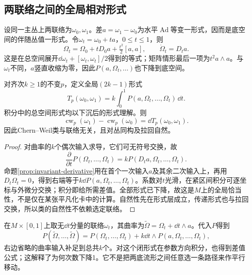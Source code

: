 \subsection{两联络之间的全局相对形式}
设同一主丛上两联络为$\omega_0,\omega_1$。差$a=\omega_1-\omega_0$为水平$\operatorname{Ad}$等变一形式，因而是底空间的伴随丛值一形式。令$\omega_t=\omega_0+ta$，$0\leq t\leq1$，则
\begin{equation}\label{eq:curvature-interpolation}
 \Omega_t=\Omega_0+tD_0a+\tfrac{t^2}{2}[a,a],
 \qquad \dot\Omega_t=D_ta.
\end{equation}
这是在总空间展开$\dd\omega_t+[\omega_t,\omega_t]/2$得到的等式；矩阵情形最后一项为$t^2a\wedge a$。与$\omega_t$不同，$a$竖直收缩为零，因此$P(a,\Omega_t,\ldots)$也下降到底空间。

\begin{theorem}[相对传递公式]\label{thm:cw-transgression}
对齐次$k\geq1$的不变$p$，定义全局$(2k-1)$形式
\begin{equation}\label{eq:cw-transgression}
 T_p(\omega_0,\omega_1)
 =k\int_0^1P(a,\Omega_t,\ldots,\Omega_t)\,\dd t.
\end{equation}
积分中的总空间形式均以下沉后的形式理解。则
\begin{equation}\label{eq:cw-difference}
 \operatorname{cw}_p(\omega_1)-\operatorname{cw}_p(\omega_0)
 =\dd T_p(\omega_0,\omega_1).
\end{equation}
因此Chern--Weil类与联络无关，且对丛同构及拉回自然。
\end{theorem}
\begin{proof}
对曲率的$k$个偶次输入求导，它们可无符号交换，故
\[
 \frac{\partial}{\partial t}P(\Omega_t,\ldots,\Omega_t)
 =kP(D_ta,\Omega_t,\ldots,\Omega_t).
\]
命题\ref{prop:invariant-derivative}用在首个一次输入$a$及其余二次输入上，再用$D_t\Omega_t=0$，得到右端等于$k\dd P(a,\Omega_t,\ldots,\Omega_t)$。系数对$t$光滑，在紧区间积分可逐坐标与外微分交换；积分即给所需差值。全部形式已下降，故这是$M$上的全局恰当性，不是仅在某张平凡化卡中的计算。自然性先在形式层成立，传递形式也与拉回交换，所以类的自然性不依赖选定联络。
\end{proof}
在$M\times[0,1]$上取无$\dd t$分量的联络$\omega_t$，其曲率为$\widetilde\Omega=\Omega_t+\dd t\wedge a$。代入$P$得到
\[
 P(\widetilde\Omega,\ldots,\widetilde\Omega)
 =P(\Omega_t,\ldots,\Omega_t)
 +k\dd t\wedge P(a,\Omega_t,\ldots,\Omega_t),
\]
右边省略的曲率输入补足到总共$k$个。对这个闭形式在参数方向积分，也得到差值公式；这解释了为何次数下降1。它不是把两底流形之间任意选一条路径来作平行移动。

